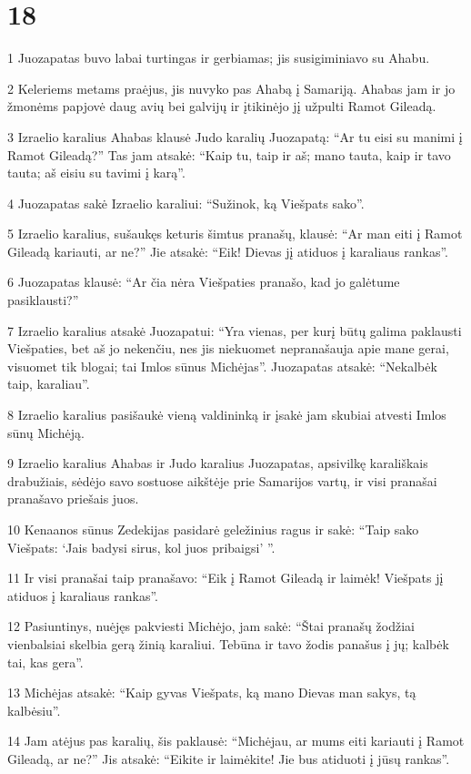 \chapter{18}

\par 1 Juozapatas buvo labai turtingas ir gerbiamas; jis susigiminiavo su Ahabu. 
\par 2 Keleriems metams praėjus, jis nuvyko pas Ahabą į Samariją. Ahabas jam ir jo žmonėms papjovė daug avių bei galvijų ir įtikinėjo jį užpulti Ramot Gileadą. 
\par 3 Izraelio karalius Ahabas klausė Judo karalių Juozapatą: “Ar tu eisi su manimi į Ramot Gileadą?” Tas jam atsakė: “Kaip tu, taip ir aš; mano tauta, kaip ir tavo tauta; aš eisiu su tavimi į karą”. 
\par 4 Juozapatas sakė Izraelio karaliui: “Sužinok, ką Viešpats sako”. 
\par 5 Izraelio karalius, sušaukęs keturis šimtus pranašų, klausė: “Ar man eiti į Ramot Gileadą kariauti, ar ne?” Jie atsakė: “Eik! Dievas jį atiduos į karaliaus rankas”. 
\par 6 Juozapatas klausė: “Ar čia nėra Viešpaties pranašo, kad jo galėtume pasiklausti?” 
\par 7 Izraelio karalius atsakė Juozapatui: “Yra vienas, per kurį būtų galima paklausti Viešpaties, bet aš jo nekenčiu, nes jis niekuomet nepranašauja apie mane gerai, visuomet tik blogai; tai Imlos sūnus Michėjas”. Juozapatas atsakė: “Nekalbėk taip, karaliau”. 
\par 8 Izraelio karalius pasišaukė vieną valdininką ir įsakė jam skubiai atvesti Imlos sūnų Michėją. 
\par 9 Izraelio karalius Ahabas ir Judo karalius Juozapatas, apsivilkę karališkais drabužiais, sėdėjo savo sostuose aikštėje prie Samarijos vartų, ir visi pranašai pranašavo priešais juos. 
\par 10 Kenaanos sūnus Zedekijas pasidarė geležinius ragus ir sakė: “Taip sako Viešpats: ‘Jais badysi sirus, kol juos pribaigsi’ ”. 
\par 11 Ir visi pranašai taip pranašavo: “Eik į Ramot Gileadą ir laimėk! Viešpats jį atiduos į karaliaus rankas”. 
\par 12 Pasiuntinys, nuėjęs pakviesti Michėjo, jam sakė: “Štai pranašų žodžiai vienbalsiai skelbia gerą žinią karaliui. Tebūna ir tavo žodis panašus į jų; kalbėk tai, kas gera”. 
\par 13 Michėjas atsakė: “Kaip gyvas Viešpats, ką mano Dievas man sakys, tą kalbėsiu”. 
\par 14 Jam atėjus pas karalių, šis paklausė: “Michėjau, ar mums eiti kariauti į Ramot Gileadą, ar ne?” Jis atsakė: “Eikite ir laimėkite! Jie bus atiduoti į jūsų rankas”. 
